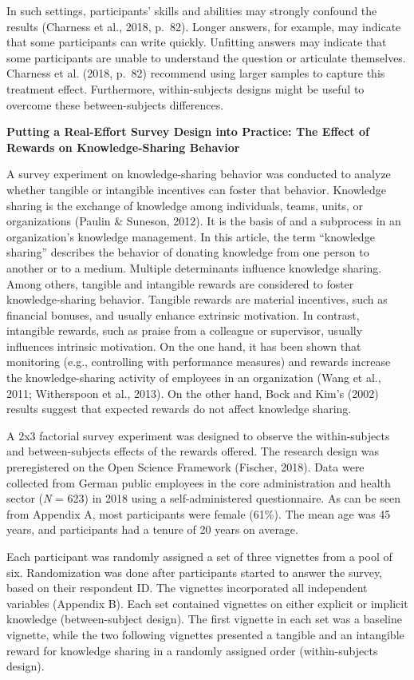 \documentclass{article}
\begin{document}
In such settings, participants' skills and abilities may strongly confound the results (Charness et al., 2018, p. 82). Longer answers, for example, may indicate that some participants can write quickly. Unfitting answers may indicate that some participants are unable to understand the question or articulate themselves. Charness et al. (2018, p. 82) recommend using larger samples to capture this treatment effect. Furthermore, within-subjects designs might be useful to overcome these between-subjects differences.

\textbf{Putting a Real-Effort Survey Design into Practice: The Effect of Rewards on Knowledge-Sharing Behavior}

A survey experiment on knowledge-sharing behavior was conducted to analyze whether tangible or intangible incentives can foster that behavior. Knowledge sharing is the exchange of knowledge among individuals, teams, units, or organizations (Paulin \& Suneson, 2012). It is the basis of and a subprocess in an organization's knowledge management. In this article, the term “knowledge sharing” describes the behavior of donating knowledge from one person to another or to a medium. Multiple determinants influence knowledge sharing. Among others, tangible and intangible rewards are considered to foster knowledge-sharing behavior. Tangible rewards are material incentives, such as financial bonuses, and usually enhance extrinsic motivation. In contrast, intangible rewards, such as praise from a colleague or supervisor, usually influences intrinsic motivation. On the one hand, it has been shown that monitoring (e.g., controlling with performance measures) and rewards increase the knowledge-sharing activity of employees in an organization (Wang et al., 2011; Witherspoon et al., 2013). On the other hand, Bock and Kim's (2002) results suggest that expected rewards do not affect knowledge sharing.

A 2x3 factorial survey experiment was designed to observe the within-subjects and between-subjects effects of the rewards offered. The research design was preregistered on the Open Science Framework (Fischer, 2018). Data were collected from German public employees in the core administration and health sector (\emph{N} = 623) in 2018 using a self-administered questionnaire. As can be seen from Appendix A, most participants were female (61\%). The mean age was 45 years, and participants had a tenure of 20 years on average.

Each participant was randomly assigned a set of three vignettes from a pool of six. Randomization was done after participants started to answer the survey, based on their respondent ID. The vignettes incorporated all independent variables (Appendix B). Each set contained vignettes on either explicit or implicit knowledge (between-subject design). The first vignette in each set was a baseline vignette, while the two following vignettes presented a tangible and an intangible reward for knowledge sharing in a randomly assigned order (within-subjects design).
\end{document}
